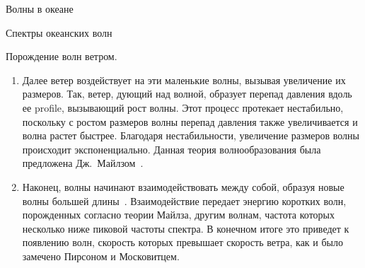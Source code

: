 \begin{chapter}{Волны в океане}
\begin{section}{Спектры океанских волн}
\begin{paragraph}{Порождение волн ветром.}
\begin{enumerate}
\item 
Далее ветер воздействует на эти маленькие волны, вызывая увеличение их 
размеров. Так, ветер, дующий над волной, образует перепад давления вдоль
ее profile, вызывающий рост волны. Этот процесс протекает нестабильно, 
поскольку с ростом размеров волны перепад давления также увеличивается и волна
растет быстрее. Благодаря нестабильности, увеличение размеров волны
происходит экспоненциально. 
Данная теория волнообразования была предложена Дж.~Майлзом~\cite{Miles:1957}.
%

\item
Наконец, волны начинают взаимодействовать между собой, образуя новые волны
большей длины~\cite{Hasselmann:1973}. Взаимодействие передает энергию
коротких волн, порожденных согласно теории Майлза, другим волнам, частота
которых несколько ниже пиковой частоты спектра. В конечном итоге это приведет
к появлению волн, скорость которых превышает скорость ветра, как и было
замечено Пирсоном и Московитцем.
%
\end{enumerate}
\end{paragraph}
\end{section}


\end{chapter}
